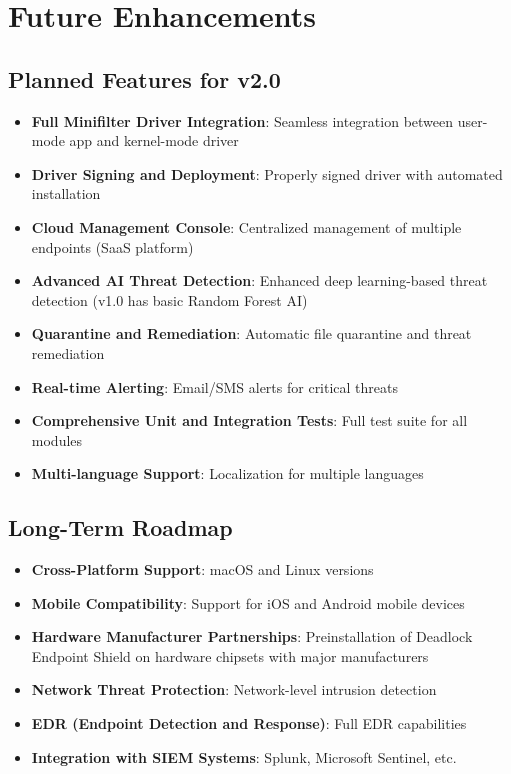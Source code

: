 \documentclass[12pt,letterpaper]{report}
\begin{document}
\chapter{Future Enhancements}
\section{Planned Features for v2.0}
\begin{itemize}
    \item \textbf{Full Minifilter Driver Integration}: Seamless integration between user-mode app and kernel-mode driver
    \item \textbf{Driver Signing and Deployment}: Properly signed driver with automated installation
    \item \textbf{Cloud Management Console}: Centralized management of multiple endpoints (SaaS platform)
    \item \textbf{Advanced AI Threat Detection}: Enhanced deep learning-based threat detection (v1.0 has basic Random Forest AI)
    \item \textbf{Quarantine and Remediation}: Automatic file quarantine and threat remediation
    \item \textbf{Real-time Alerting}: Email/SMS alerts for critical threats
    \item \textbf{Comprehensive Unit and Integration Tests}: Full test suite for all modules
    \item \textbf{Multi-language Support}: Localization for multiple languages
\end{itemize}

\section{Long-Term Roadmap}
\begin{itemize}
    \item \textbf{Cross-Platform Support}: macOS and Linux versions
    \item \textbf{Mobile Compatibility}: Support for iOS and Android mobile devices
    \item \textbf{Hardware Manufacturer Partnerships}: Preinstallation of Deadlock Endpoint Shield on hardware chipsets with major manufacturers
    \item \textbf{Network Threat Protection}: Network-level intrusion detection
    \item \textbf{EDR (Endpoint Detection and Response)}: Full EDR capabilities
    \item \textbf{Integration with SIEM Systems}: Splunk, Microsoft Sentinel, etc.
\end{itemize}
\end{document}
